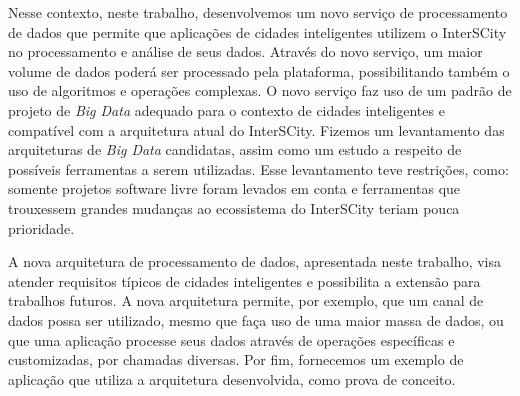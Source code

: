 Nesse contexto, neste trabalho, desenvolvemos um novo serviço de processamento de dados que
permite que aplicações de cidades inteligentes utilizem o InterSCity no processamento e
análise de seus dados. Através do novo serviço,
um maior volume de dados poderá ser processado pela plataforma, possibilitando
também o uso de algoritmos e operações complexas. O novo serviço
faz uso de um padrão de projeto de \textit{Big Data} adequado para o contexto
de cidades inteligentes e compatível com a arquitetura atual do InterSCity.
Fizemos um levantamento das arquiteturas de \textit{Big Data} candidatas, assim
como um estudo a respeito de possíveis ferramentas a serem utilizadas. Esse
levantamento teve restrições, como: somente projetos software livre
foram levados em conta e ferramentas que trouxessem grandes mudanças ao
ecossistema do InterSCity teriam pouca prioridade.

A nova arquitetura de processamento de dados, apresentada neste trabalho, visa
atender requisitos típicos de cidades inteligentes e possibilita a extensão
para trabalhos futuros. A nova arquitetura permite, por exemplo, que um
canal de dados possa ser utilizado, mesmo que faça uso de uma
maior massa de dados, ou que uma aplicação processe seus dados através de
operações específicas e customizadas, por chamadas diversas. 
Por fim, fornecemos um exemplo de aplicação que utiliza a arquitetura
desenvolvida, como prova de conceito.
